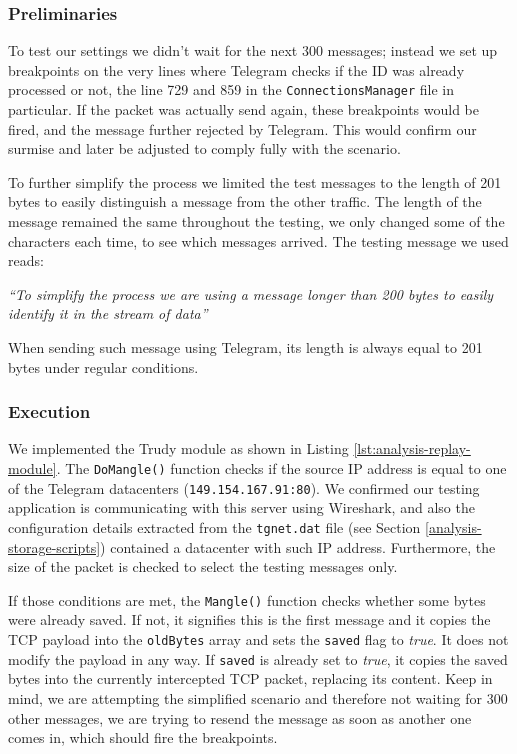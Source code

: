 \documentclass[thesis=M,english]{FITthesis}[2012/10/20]
\begin{document}
\subsubsection{Preliminaries}

To test our settings we didn't wait for the next 300 messages; instead we set up breakpoints on the very lines where Telegram checks if the ID was already processed or not, the line 729 and 859 in the \texttt{ConnectionsManager} file in particular. If the packet was actually send again, these breakpoints would be fired, and the message further rejected by Telegram. This would confirm our surmise and later be adjusted to comply fully with the scenario.

To further simplify the process we limited the test messages to the length of 201 bytes to easily distinguish a message from the other traffic. The length of the message remained the same throughout the testing, we only changed some of the characters each time, to see which messages arrived. The testing message we used reads:

\begin{displayquote}
\emph{``To simplify the process we are using a message longer than 200 bytes to easily identify it in the stream of data''}
\end{displayquote}

When sending such message using Telegram, its length is always equal to 201 bytes under regular conditions.

\subsubsection{Execution}\label{analysis-trudy-execution}

We implemented the Trudy module as shown in Listing \ref{lst:analysis-replay-module}. The \texttt{DoMangle()} function checks if the source IP address is equal to one of the Telegram datacenters (\texttt{149.154.167.91:80}). We confirmed our testing application is communicating with this server using Wireshark, and also the configuration details extracted from the \texttt{tgnet.dat} file (see Section \ref{analysis-storage-scripts}) contained a datacenter with such IP address. Furthermore, the size of the packet is checked to select the testing messages only.

If those conditions are met, the \texttt{Mangle()} function checks whether some bytes were already saved. If not, it signifies this is the first message and it copies the TCP payload into the \texttt{oldBytes} array and sets the \texttt{saved} flag to \emph{true}. It does not modify the payload in any way. If \texttt{saved} is already set to \emph{true}, it copies the saved bytes into the currently intercepted TCP packet, replacing its content. Keep in mind, we are attempting the simplified scenario and therefore not waiting for 300 other messages, we are trying to resend the message as soon as another one comes in, which should fire the breakpoints.
\end{document}
